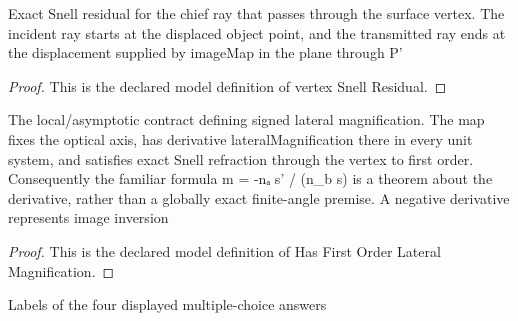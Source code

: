 \begin{definition}
  \label{def:physics:phyx-mini-0040:phyxminiproblems-problemphyxmini0040-vertexsnellresidual}
  Exact Snell residual for the chief ray that passes through the surface vertex. The incident ray starts at the displaced object point, and the transmitted ray ends at the displacement supplied by imageMap in the plane through P'
\end{definition}
\begin{proof}
  This is the declared model definition of vertex Snell Residual.
\end{proof}
\begin{definition}
  \label{def:physics:phyx-mini-0040:phyxminiproblems-problemphyxmini0040-hasfirstorderlateralmagnification}
  The local/asymptotic contract defining signed lateral magnification. The map fixes the optical axis, has derivative lateralMagnification there in every unit system, and satisfies exact Snell refraction through the vertex to first order. Consequently the familiar formula m = -nₐ s' / (n\_b s) is a theorem about the derivative, rather than a globally exact finite-angle premise. A negative derivative represents image inversion
\end{definition}
\begin{proof}
  This is the declared model definition of Has First Order Lateral Magnification.
\end{proof}
\begin{definition}
  \label{def:physics:phyx-mini-0040:phyxminiproblems-problemphyxmini0040-answerchoice}
  Labels of the four displayed multiple-choice answers
\end{definition}

